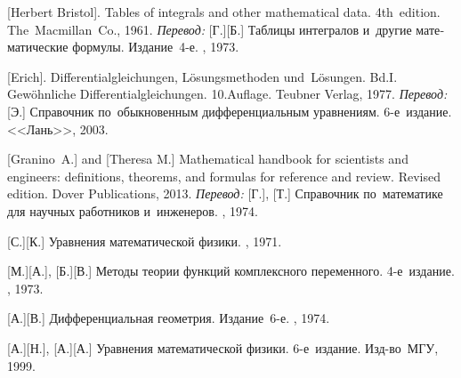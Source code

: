 \begin{thebibliography}{123}
\begin{otherlanguage}{russian}
[Herbert Bristol]. Tables of integrals and other mathematical data. 4th~edition. The~Macmillan~Co., 1961. 
\emph{Перевод:} [Г.][Б.] Таблицы интегралов и~другие математические формулы. Издание~4\hbox{-}е. \naukapublisher, 1973. 

[Erich]. Differentialgleichungen, Lösungsmethoden und~Lö\-sun\-gen. Bd.\:I. Gewöhnliche Differentialgleichungen. 10.\:Auflage. Teubner Verlag, 1977. 
\emph{Перевод:} [Э.] Справочник по~обыкновенным дифференциальным уравнениям. 6\hbox{-}е~издание. <<Лань>>, 2003. 

[Granino~A.] and [Theresa M.]
Mathematical handbook for scientists and engineers: definitions, theorems, and formulas for reference and review.
Revised edition. Dover Publications, 2013. 
\emph{Перевод:} [Г.], [Т.] Справочник по~математике для научных работников и~инженеров. \naukapublisher, 1974. 

[С.][К.] Уравнения математической физики. \naukapublisher, 1971. 

[М.][А.], [Б.][В.] Методы теории функций комплексного переменного. 4\hbox{-}е~издание. \naukapublisher, 1973. 

[А.][В.] Дифференциальная геометрия. Издание~6\hbox{-}е. \naukapublisher, 1974. 

[А.][Н.], [А.][А.] Уравнения математической физики. 6\hbox{-}е~издание. Изд\hbox{-}во~МГУ, 1999. 

\end{otherlanguage}

\normalsize
\end{thebibliography}
